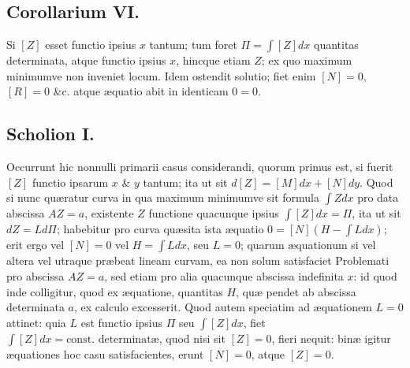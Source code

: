 \subsection*{Corollarium VI.}
Si $[Z]$ esset functio ipsius $x$ tantum; tum foret $\Pi=\int[Z]dx$ quantitas determinata, atque functio ipsius $x$, hincque etiam $Z$; ex quo maximum minimumve non inveniet locum. Idem ostendit solutio; fiet enim $[N]=0$, $[R]=0$ \&c. atque æquatio abit in identicam $0=0$.
\subsection*{Scholion I.}
Occurrunt hic nonnulli primarii casus considerandi, quorum primus est, si fuerit $[Z]$ functio ipsarum $x$ \& $y$ tantum; ita ut sit $d[Z]=[M]dx+[N]dy$. Quod si nunc quæratur curva in qua maximum minimumve sit formula $\int Zdx$ pro data abscissa $AZ=a$, existente $Z$ functione quacunque ipsius $\int[Z]dx=\Pi$, ita ut sit $dZ=Ld\Pi$; habebitur pro curva quæsita ista æquatio $0=[N](H-\int Ldx)$; erit ergo vel $[N]=0$ vel $H=\int Ldx$, seu $L=0$; quarum æquationum si vel altera vel utraque præbeat lineam curvam, ea non solum satisfaciet Problemati pro abscissa $AZ=a$, sed etiam pro alia quacunque abscissa indefinita $x$: id quod inde colligitur, quod ex æquatione, quantitas $H$, quæ pendet ab abscissa determinata $a$, ex calculo excesserit. Quod autem speciatim ad æquationem $L=0$ attinet: quia $L$ est functio ipsius $\Pi$ seu $\int[Z]dx$, fiet $\int[Z]dx=\text{const. determinatæ}$, quod nisi sit $[Z]=0$, fieri nequit: binæ igitur æquationes hoc casu satisfacientes, erunt $[N]=0$, atque $[Z]=0$.
